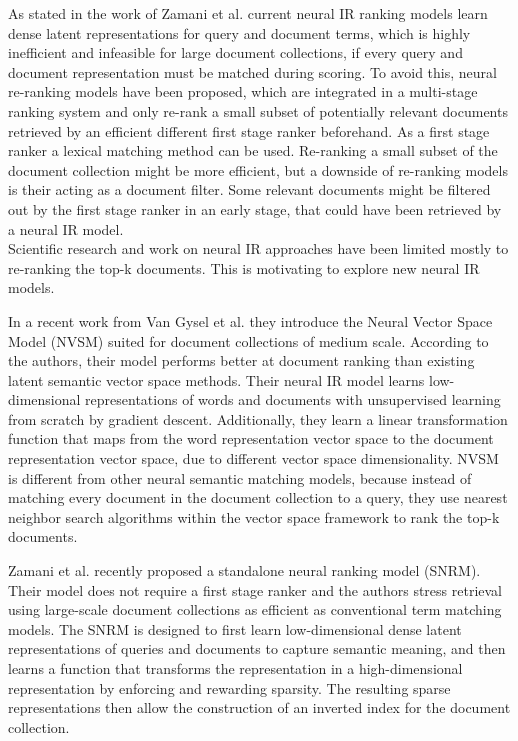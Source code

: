 As stated in the work of Zamani et al. \cite{zamani:2018:from-neural-reranking-to-neural-ranking} current neural IR ranking models learn dense latent representations for query and document terms, which is highly inefficient and infeasible for large document collections, if every query and document representation must be matched during scoring.
To avoid this, neural re-ranking models have been proposed, which are integrated in a multi-stage ranking system and only re-rank a small subset of potentially relevant documents retrieved by an efficient different first stage ranker beforehand. \cite{zamani:2018:from-neural-reranking-to-neural-ranking} 
As a first stage ranker a lexical matching method can be used. \cite{van-gysel:2017:neural-vector-spaces} 
Re-ranking a small subset of the document collection might be more efficient, but a downside of re-ranking models is their acting as a document filter.
Some relevant documents might be filtered out by the first stage ranker in an early stage, that could have been retrieved by a neural IR model. \cite{zamani:2018:from-neural-reranking-to-neural-ranking}
\\Scientific research and work on neural IR approaches have been limited mostly to re-ranking the top-k documents. \cite{mitra:2018:introduction-neural-ir}
This is motivating to explore new neural IR models.

In a recent work from Van Gysel et al. \cite{van-gysel:2017:neural-vector-spaces} they introduce the Neural Vector Space Model (NVSM) suited for document collections of medium scale.
According to the authors, their model performs better at document ranking than existing latent semantic vector space methods.
Their neural IR model learns low-dimensional representations of words and documents with unsupervised learning from scratch by gradient descent.
Additionally, they learn a linear transformation function that maps from the word representation vector space to the document representation vector space, due to different vector space dimensionality.
NVSM is different from other neural semantic matching models, because instead of matching every document in the document collection to a query, they use nearest neighbor search algorithms within the vector space framework to rank the top-k documents. \cite{van-gysel:2017:neural-vector-spaces}

Zamani et al. recently proposed \cite{zamani:2018:from-neural-reranking-to-neural-ranking} a standalone neural ranking model (SNRM).
Their model does not require a first stage ranker and the authors stress retrieval using large-scale document collections as efficient as conventional term matching models.
The SNRM is designed to first learn low-dimensional dense latent representations of queries and documents to capture semantic meaning, and then learns a function that transforms the representation in a high-dimensional representation by enforcing and rewarding sparsity.
The resulting sparse representations then allow the construction of an inverted index for the document collection. \cite{zamani:2018:from-neural-reranking-to-neural-ranking}
